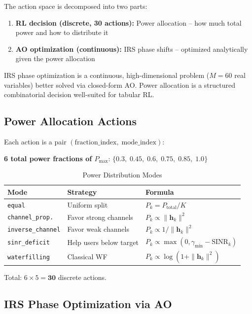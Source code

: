 \documentclass[11pt,a4paper]{article}
\begin{document}
The action space is decomposed into two parts:
\begin{enumerate}
    \item \textbf{RL decision (discrete, 30 actions):} Power allocation -- how much total power and how to distribute it
    \item \textbf{AO optimization (continuous):} IRS phase shifts -- optimized analytically given the power allocation
\end{enumerate}

IRS phase optimization is a continuous, high-dimensional problem ($M = 60$ real variables) better solved via closed-form AO. Power allocation is a structured combinatorial decision well-suited for tabular RL.

\subsection{Power Allocation Actions}

Each action is a pair $(\text{fraction\_index},\;\text{mode\_index})$:

\medskip
\noindent\textbf{6 total power fractions of $P_{\max}$}: $\{0.3,\; 0.45,\; 0.6,\; 0.75,\; 0.85,\; 1.0\}$

\begin{table}[H]
\centering
\caption{Power Distribution Modes}
\begin{tabular}{lll}
\toprule
\textbf{Mode} & \textbf{Strategy} & \textbf{Formula} \\
\midrule
\texttt{equal} & Uniform split & $P_k = P_{\mathrm{total}} / K$ \\
\texttt{channel\_prop.} & Favor strong channels & $P_k \propto \|\mathbf{h}_k\|^2$ \\
\texttt{inverse\_channel} & Favor weak channels & $P_k \propto 1/\|\mathbf{h}_k\|^2$ \\
\texttt{sinr\_deficit} & Help users below target & $P_k \propto \max(0, \gamma_{\min} - \mathrm{SINR}_k)$ \\
\texttt{waterfilling} & Classical WF & $P_k \propto \log(1 + \|\mathbf{h}_k\|^2)$ \\
\bottomrule
\end{tabular}
\end{table}

Total: $6 \times 5 = \mathbf{30}$ discrete actions.

\subsection{IRS Phase Optimization via AO}
\end{document}
